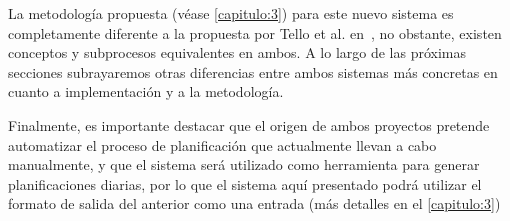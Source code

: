 La metodología propuesta (véase \autoref{capitulo:3}) para este nuevo sistema es completamente diferente a la propuesta por Tello et al. en~\cite{articulo1}, no obstante, existen conceptos y subprocesos equivalentes en ambos. 
A lo largo de las próximas secciones subrayaremos otras diferencias entre ambos sistemas más concretas en cuanto a implementación y a la metodología.

Finalmente, es importante destacar que el origen de ambos proyectos pretende automatizar el proceso de planificación que actualmente llevan a cabo manualmente, y que el sistema \legacy{} será utilizado como herramienta para generar planificaciones diarias, por lo que el sistema aquí presentado podrá utilizar el formato de salida del anterior como una entrada (más detalles en el \autoref{capitulo:3}) 



